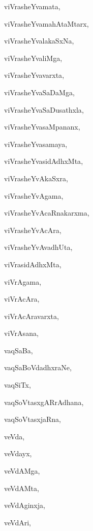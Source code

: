 \begin{multicols}{2}
{viVrasheYvamata}, \pageref{viVrasheYvamata}

{viVrasheYvamahAtaMtarx}, \pageref{viVrasheYvamahAtaMtarx}

{viVrasheYvalakaSxNa}, \pageref{viVrasheYvalakaSxNa}

{viVrasheYvaliMga}, \pageref{viVrasheYvaliMga}

{viVrasheYvavarxta}, \pageref{viVrasheYvavarxta}

{viVrasheYvaSaDaMga}, \pageref{viVrasheYvaSaDaMga}

{viVrasheYvaSaDusathxla}, \pageref{viVrasheYvaSaDusathxla}

{viVrasheYvasaMpananx}, \pageref{viVrasheYvasaMpananx}

{viVrasheYvasamaya}, \pageref{viVrasheYvasamaya}

{viVrasheYvasidAdhxMta}, \pageref{viVrasheYvasidAdhxMta}

{viVrasheYvAkaSxra}, \pageref{viVrasheYvAkaSxra}

{viVrasheYvAgama}, \pageref{viVrasheYvAgama}

{viVrasheYvAcaRnakarxma}, \pageref{viVrasheYvAcaRnakarxma}

{viVrasheYvAcAra}, \pageref{viVrasheYvAcAra}

{viVrasheYvAvadhUta}, \pageref{viVrasheYvAvadhUta}

{viVrasidAdhxMta}, \pageref{viVrasidAdhxMta}

{viVrAgama}, \pageref{viVrAgama}

{viVrAcAra}, \pageref{viVrAcAra}

{viVrAcAravarxta}, \pageref{viVrAcAravarxta}

{viVrAsana}, \pageref{viVrAsana}

{vaqSaBa}, \pageref{vaqSaBa}

{vaqSaBoVdadhxraNe}, \pageref{vaqSaBoVdadhxraNe}

{vaqSiTx}, \pageref{vaqSiTx}

{vaqSoVtasxgARrAdhana}, \pageref{vaqSoVtasxgARrAdhana}

{vaqSoVtasxjaRna}, \pageref{vaqSoVtasxjaRna}

{veVda}, \pageref{veVda}

{veVdayx}, \pageref{veVdayx}

{veVdAMga}, \pageref{veVdAMga}

{veVdAMta}, \pageref{veVdAMta}

{veVdAginxja}, \pageref{veVdAginxja}

{veVdAri}, \pageref{veVdAri}


\end{multicols}
